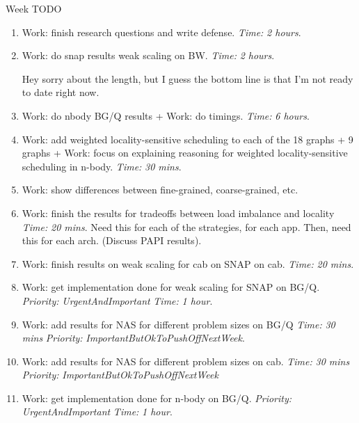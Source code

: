 \documentclass[serif, mathserif, final]{beamer}
\newcommand{\timeEst}[1]{\textit{Time:} \textit{#1}}
\newcommand{\priority}[1]{\textit{Priority:} \textit{#1}}
\begin{document}
\begin{frame}{}
\begin{columns}
\begin{column}{0.50\linewidth}
  \begin{block}{Week TODO} 
    \begin{enumerate} 
    \item \tiny Work: finish research questions and write defense. \timeEst{2 hours}.  

    \item \tiny Work: do snap results weak scaling on BW. \timeEst{2 hours}. 

Hey sorry about the length, but I guess the bottom line is that I'm not ready to date right now. 

    \item \tiny Work: do nbody BG/Q results + Work: do
      timings. \timeEst{6 hours}. 

    \item \tiny Work: add weighted locality-sensitive scheduling to
      each of the 18 graphs + 9 graphs + Work: focus on explaining
      reasoning for weighted locality-sensitive scheduling in n-body. 
      \timeEst{30 mins}. 

    \item \tiny Work: show differences between fine-grained,
      coarse-grained, etc. 

    \item \tiny Work: finish the results for tradeoffs between load
      imbalance and locality \timeEst{20 mins}. Need this for each of
      the strategies, for each app. Then, need this for each arch.
      (Discuss PAPI results). 

    \item \tiny Work: finish results on weak scaling for cab on SNAP on cab. \timeEst{20 mins}.

    \item \tiny Work: get implementation done for weak scaling for 
      SNAP on BG/Q. \priority{UrgentAndImportant} \timeEst{1 hour}.       

    \item \tiny Work: add results for NAS for different problem sizes
      on BG/Q  \timeEst{30 mins } \priority{ImportantButOkToPushOffNextWeek}.

    \item \tiny Work: add results for NAS for different problem sizes
      on cab. \timeEst{30 mins } \priority{ImportantButOkToPushOffNextWeek} 

    \item \tiny Work: get implementation done for
      n-body on BG/Q. \priority{UrgentAndImportant} \timeEst{1 hour}.       


\end{enumerate}
\end{block}
\end{column}
\end{columns}
\end{frame}
\end{document}
